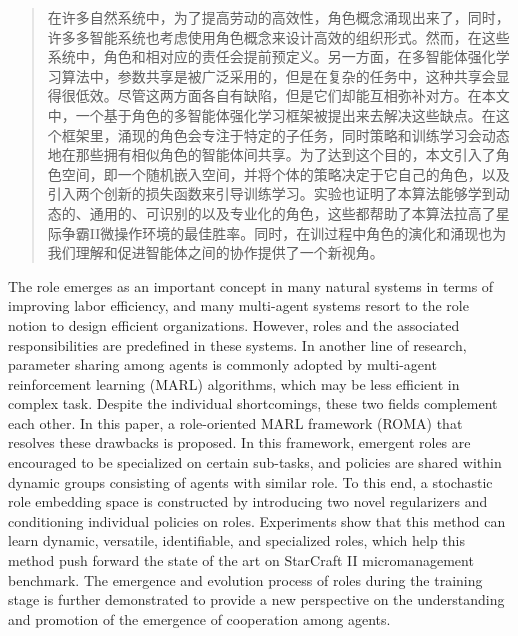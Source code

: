 

\begin{abstract}
   在许多自然系统中，为了提高劳动的高效性，角色概念涌现出来了，同时，许多多智能系统也考虑使用角色概念来设计高效的组织形式。然而，在这些系统中，角色和相对应的责任会提前预定义。另一方面，在多智能体强化学习算法中，参数共享是被广泛采用的，但是在复杂的任务中，这种共享会显得很低效。尽管这两方面各自有缺陷，但是它们却能互相弥补对方。在本文中，一个基于角色的多智能体强化学习框架被提出来去解决这些缺点。在这个框架里，涌现的角色会专注于特定的子任务，同时策略和训练学习会动态地在那些拥有相似角色的智能体间共享。为了达到这个目的，本文引入了角色空间，即一个随机嵌入空间，并将个体的策略决定于它自己的角色，以及引入两个创新的损失函数来引导训练学习。实验也证明了本算法能够学到动态的、通用的、可识别的以及专业化的角色，这些都帮助了本算法拉高了星际争霸II微操作环境的最佳胜率。同时，在训过程中角色的演化和涌现也为我们理解和促进智能体之间的协作提供了一个新视角。

\end{abstract}

\begin{enabstract}
  The role emerges as an important concept in many natural systems in terms of improving labor efficiency, and many multi-agent systems resort to the role notion to design efficient organizations. However, roles and the associated responsibilities are predefined in these systems. In another line of research, parameter sharing among agents is commonly adopted by multi-agent reinforcement learning (MARL) algorithms, which may be less efficient in complex task. Despite the individual shortcomings, these two fields complement each other. In this paper, a role-oriented MARL framework (ROMA) that resolves these drawbacks is proposed. In this framework, emergent roles are encouraged to be specialized on certain sub-tasks, and policies are shared within dynamic groups consisting of agents with similar role. To this end, a stochastic role embedding space is constructed by introducing two novel regularizers and conditioning individual policies on roles. Experiments show that this method can learn dynamic, versatile, identifiable, and specialized roles, which help this method push forward the state of the art on StarCraft II micromanagement benchmark. The emergence and evolution process of roles during the training stage is further demonstrated to provide a new perspective on the understanding and promotion of the emergence of cooperation among agents.

\end{enabstract}
